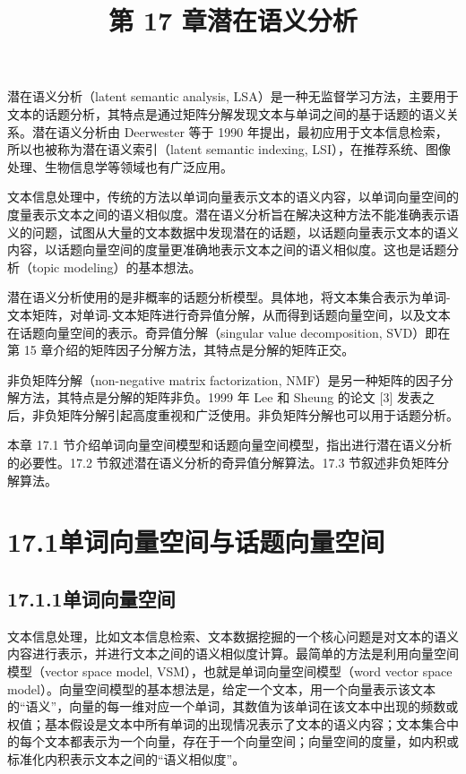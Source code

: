 \documentclass[UTF8,12pt,a4paper,fontset=fandol]{ctexart}
\title{第 17 章\quad 潜在语义分析}
\author{}
\date{}
\begin{document}
\maketitle

潜在语义分析（latent semantic analysis, LSA）是一种无监督学习方法，主要用于文本的话题分析，其特点是通过矩阵分解发现文本与单词之间的基于话题的语义关系。潜在语义分析由 Deerwester 等于 1990 年提出，最初应用于文本信息检索，所以也被称为潜在语义索引（latent semantic indexing, LSI），在推荐系统、图像处理、生物信息学等领域也有广泛应用。

文本信息处理中，传统的方法以单词向量表示文本的语义内容，以单词向量空间的度量表示文本之间的语义相似度。潜在语义分析旨在解决这种方法不能准确表示语义的问题，试图从大量的文本数据中发现潜在的话题，以话题向量表示文本的语义内容，以话题向量空间的度量更准确地表示文本之间的语义相似度。这也是话题分析（topic modeling）的基本想法。

潜在语义分析使用的是非概率的话题分析模型。具体地，将文本集合表示为单词-文本矩阵，对单词-文本矩阵进行奇异值分解，从而得到话题向量空间，以及文本在话题向量空间的表示。奇异值分解（singular value decomposition, SVD）即在第 15 章介绍的矩阵因子分解方法，其特点是分解的矩阵正交。

非负矩阵分解（non-negative matrix factorization, NMF）是另一种矩阵的因子分解方法，其特点是分解的矩阵非负。1999 年 Lee 和 Sheung 的论文 [3] 发表之后，非负矩阵分解引起高度重视和广泛使用。非负矩阵分解也可以用于话题分析。

本章 17.1 节介绍单词向量空间模型和话题向量空间模型，指出进行潜在语义分析的必要性。17.2 节叙述潜在语义分析的奇异值分解算法。17.3 节叙述非负矩阵分解算法。

\section*{17.1\quad 单词向量空间与话题向量空间}

\subsection*{17.1.1\quad 单词向量空间}

文本信息处理，比如文本信息检索、文本数据挖掘的一个核心问题是对文本的语义内容进行表示，并进行文本之间的语义相似度计算。最简单的方法是利用向量空间模型（vector space model, VSM），也就是单词向量空间模型（word vector space model）。向量空间模型的基本想法是，给定一个文本，用一个向量表示该文本的“语义”，向量的每一维对应一个单词，其数值为该单词在该文本中出现的频数或权值；基本假设是文本中所有单词的出现情况表示了文本的语义内容；文本集合中的每个文本都表示为一个向量，存在于一个向量空间；向量空间的度量，如内积或标准化内积表示文本之间的“语义相似度”。
\end{document}
